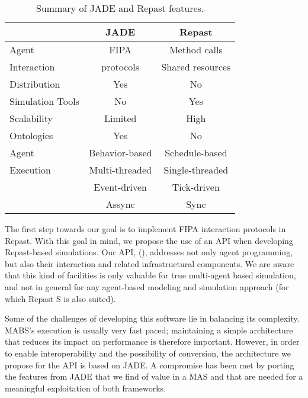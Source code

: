 \begin{table}[h]
	\normalsize
	\caption{Summary of JADE and Repast features.}
	\label{tab:jadevsrep}
	\begin{center}
		\begin{tabular}{l|cc}
		\hline

		\hline
		\textbf{} & \textbf{JADE} & \textbf{Repast} \\ %
		\hline
			Agent 		& FIPA  	&  Method calls  \\ %
			Interaction	& protocols	&  Shared resources \\
		\hline
			Distribution & Yes & No \\ %
		\hline
			Simulation Tools & No & Yes \\ %
		\hline
			Scalability & Limited & High \\ %
		\hline
			Ontologies & Yes & No \\ %
		\hline
			Agent  		& Behavior-based & Schedule-based  \\ %
			Execution	& Multi-threaded & Single-threaded \\ %
						& Event-driven   & Tick-driven 	   \\ %
						& Assync		 & Sync 		   \\ %
		\hline
		\end{tabular}
	\end{center}
\end{table} 

The first step towards our goal is to implement \gls{FIPA} interaction protocols in Repast. With this goal in mind, we propose the use of an API when developing Repast-based simulations. Our API, \apiname{} (\apilongname{}), addresses not only agent programming, but also their interaction and related infrastructural components.
We are aware that this kind of facilities is only valuable for true multi-agent based simulation, and not in general for any agent-based modeling and simulation approach (for which Repast S is also suited).

Some of the challenges of developing this software lie in balancing its complexity.
MABS's execution is usually very fast paced; maintaining a simple architecture that reduces its impact on performance is therefore important.
However, in order to enable interoperability and the possibility of conversion, the architecture we propose for the API is based on \gls{JADE}.
A compromise has been met by porting the features from \gls{JADE} that we find of value in a \gls{MAS} and that are needed for a meaningful exploitation of both frameworks.

